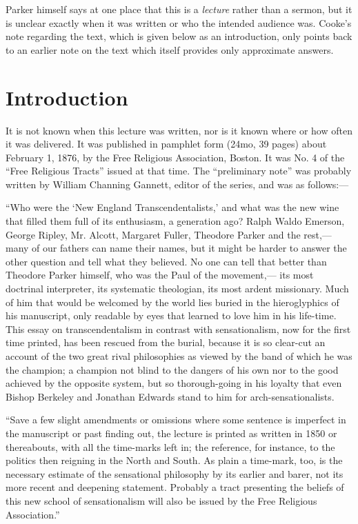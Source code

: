 \documentclass[12pt]{article}
\begin{document}
Parker himself says at one place that this is a \emph{lecture} rather than a sermon, but it is unclear exactly when it was written or who the intended audience was. Cooke's note regarding the text, which is given below as an introduction, only points back to an earlier note on the text which itself provides only approximate answers.

\section*{Introduction}

It is not known when this lecture was written, nor is it known where or how often it was delivered. It was published in pamphlet form (24mo, 39 pages) about February 1, 1876, by the Free Religious Association, Boston. It was No. 4 of the ``Free Religious Tracts'' issued at that time. The ``preliminary note'' was probably written by William Channing Gannett, editor of the series, and was as follows:---

``Who were the `New England Transcendentalists,' and what was the new wine that filled them full of its enthusiasm, a generation ago? Ralph Waldo Emerson, George Ripley, Mr. Alcott, Margaret Fuller, Theodore Parker and the rest,--- many of our fathers can name their names, but it might be harder to answer the other question and tell what they believed. No one can tell that better than Theodore Parker himself, who was the Paul of the movement,--- its most doctrinal interpreter, its systematic theologian, its most ardent missionary. Much of him that would be welcomed by the world lies buried in the hieroglyphics of his manuscript, only readable by eyes that learned to love him in his life-time. This essay on transcendentalism in contrast with sensationalism, now for the first time printed, has been rescued from the burial, because it is so clear-cut an account of the two great rival philosophies as viewed by the band of which he was the champion; a champion not blind to the dangers of his own nor to the good achieved by the opposite system, but so thorough-going in his loyalty that even Bishop Berkeley and Jonathan Edwards stand to him for arch-sensationalists. 

``Save a few slight amendments or omissions where some sentence is imperfect in the manuscript or past finding out, the lecture is printed as written in 1850 or thereabouts, with all the time-marks left in; the reference, for instance, to the politics then reigning in the North and South. As plain a time-mark, too, is the necessary estimate of the sensational philosophy by its earlier and barer, not its more recent and deepening statement. Probably a tract presenting the beliefs of this new school of sensationalism will also be issued by the Free Religious Association.''
\end{document}
